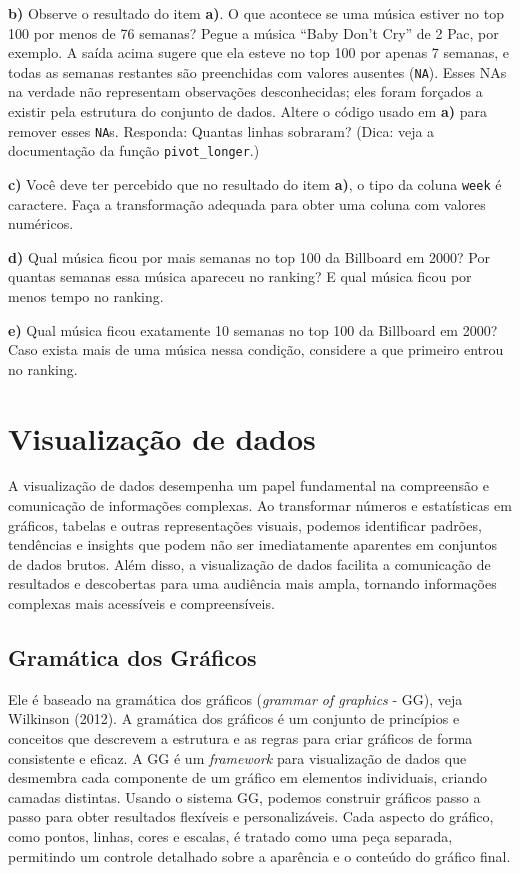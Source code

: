 \documentclass[
  portuguese,
  letterpaper,
  DIV=11,
  numbers=noendperiod]{scrreprt}
\theoremstyle{definition}
\theoremstyle{remark}
\begin{document}
\textbf{b)} Observe o resultado do item \textbf{a)}. O que acontece se
uma música estiver no top 100 por menos de 76 semanas? Pegue a música
``Baby Don't Cry'' de 2 Pac, por exemplo. A saída acima sugere que ela
esteve no top 100 por apenas 7 semanas, e todas as semanas restantes são
preenchidas com valores ausentes (\texttt{NA}). Esses NAs na verdade não
representam observações desconhecidas; eles foram forçados a existir
pela estrutura do conjunto de dados. Altere o código usado em
\textbf{a)} para remover esses \texttt{NA}s. Responda: Quantas linhas
sobraram? (Dica: veja a documentação da função \texttt{pivot\_longer}.)

\textbf{c)} Você deve ter percebido que no resultado do item
\textbf{a)}, o tipo da coluna \texttt{week} é caractere. Faça a
transformação adequada para obter uma coluna com valores numéricos.

\textbf{d)} Qual música ficou por mais semanas no top 100 da Billboard
em 2000? Por quantas semanas essa música apareceu no ranking? E qual
música ficou por menos tempo no ranking.

\textbf{e)} Qual música ficou exatamente 10 semanas no top 100 da
Billboard em 2000? Caso exista mais de uma música nessa condição,
considere a que primeiro entrou no ranking.

\chapter{Visualização de dados}\label{ch-dataviz}

A visualização de dados desempenha um papel fundamental na compreensão e
comunicação de informações complexas. Ao transformar números e
estatísticas em gráficos, tabelas e outras representações visuais,
podemos identificar padrões, tendências e insights que podem não ser
imediatamente aparentes em conjuntos de dados brutos. Além disso, a
visualização de dados facilita a comunicação de resultados e descobertas
para uma audiência mais ampla, tornando informações complexas mais
acessíveis e compreensíveis.

\section{Gramática dos Gráficos}\label{gramuxe1tica-dos-gruxe1ficos}

Ele é baseado na gramática dos gráficos (\emph{grammar of graphics} -
GG), veja Wilkinson (2012). A gramática dos gráficos é um conjunto de
princípios e conceitos que descrevem a estrutura e as regras para criar
gráficos de forma consistente e eficaz. A GG é um \emph{framework} para
visualização de dados que desmembra cada componente de um gráfico em
elementos individuais, criando camadas distintas. Usando o sistema GG,
podemos construir gráficos passo a passo para obter resultados flexíveis
e personalizáveis. Cada aspecto do gráfico, como pontos, linhas, cores e
escalas, é tratado como uma peça separada, permitindo um controle
detalhado sobre a aparência e o conteúdo do gráfico final.
\end{document}
